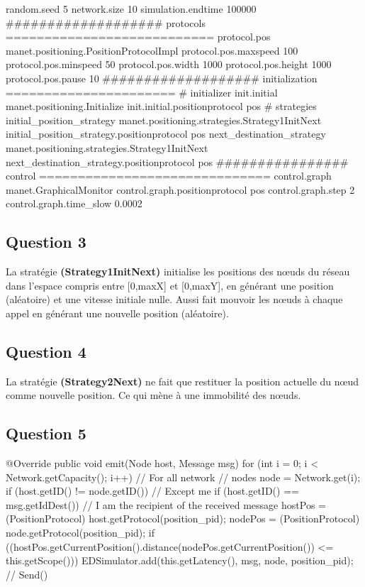 \documentclass[10pt]{report}
\begin{document}
\begin{boxedlisting}
random.seed 5
network.size 10
simulation.endtime 100000
################### protocols ===========================
protocol.pos manet.positioning.PositionProtocolImpl
protocol.pos.maxspeed 100
protocol.pos.minspeed 50
protocol.pos.width 1000
protocol.pos.height 1000
protocol.pos.pause 10
################### initialization ======================
# initializer
init.initial manet.positioning.Initialize
init.initial.positionprotocol pos
# strategies
initial_position_strategy manet.positioning.strategies.Strategy1InitNext
initial_position_strategy.positionprotocol pos
next_destination_strategy manet.positioning.strategies.Strategy1InitNext
next_destination_strategy.positionprotocol pos
################ control ==============================
control.graph manet.GraphicalMonitor
control.graph.positionprotocol pos
control.graph.step 2
control.graph.time_slow 0.0002
\end{boxedlisting}

\subsection{Question 3}
La stratégie \textbf{(Strategy1InitNext)} initialise les positions des nœuds du réseau dans l'espace compris entre [0,maxX] et [0,maxY], en générant une position (aléatoire) et une vitesse initiale nulle. Aussi fait mouvoir les nœuds à chaque appel en générant une nouvelle position (aléatoire).

\subsection{Question 4}
La stratégie \textbf{(Strategy2Next)} ne fait que restituer la position actuelle du nœud comme nouvelle position. Ce qui mène à une immobilité des nœuds.

\subsection{Question 5}

\begin{boxedlisting}
@Override
public void emit(Node host, Message msg) {
	for (int i = 0; i < Network.getCapacity(); i++) { // For all network
															// nodes
		node = Network.get(i);
		if (host.getID() != node.getID()) { // Except me
			if (host.getID() == msg.getIdDest()) { // I am the recipient of the received message
				hostPos = (PositionProtocol) host.getProtocol(position_pid);
				nodePos = (PositionProtocol) node.getProtocol(position_pid);
				if ((hostPos.getCurrentPosition().distance(nodePos.getCurrentPosition()) <= this.getScope())) {
					EDSimulator.add(this.getLatency(), msg, node, position_pid); // Send()
				}
			}
		}
	}
}
\end{boxedlisting}
\end{document}
